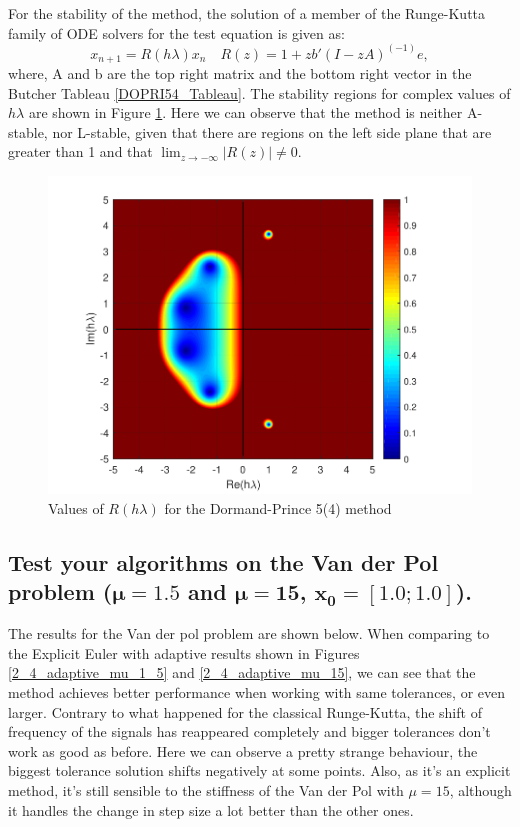 For the stability of the method, the solution of a member of the Runge-Kutta family of ODE solvers for the test equation is given as:
\begin{equation*}
    x_{n+1} = R(h \lambda) x_n \hspace{1em} R(z) = 1 + z b'(I-zA)^(-1)e,
\end{equation*}
where, A and b are the top right matrix and the bottom right vector in the Butcher Tableau \ref{DOPRI54_Tableau}. The stability regions for complex values of $h\lambda$ are shown in Figure \ref{7_3_stability_regions}. Here we can observe that the method is neither A-stable, nor L-stable, given that there are regions on the left side plane that are greater than 1 and that $\lim_{z \to -\infty}|R(z)| \neq 0$.

\begin{figure}[H]
    \centering
    \includegraphics[width=0.7\linewidth]{images/7/7_3_stability_regions.pdf} 
    \caption{Values of $R(h\lambda)$ for the Dormand-Prince 5(4) method}
    \label{7_3_stability_regions}
\end{figure}

\pagebreak

\subsection{Test your algorithms on the Van der Pol problem \texorpdfstring{($\mathbf{\mu = 1.5}$ and $\mathbf{\mu = 15}$, $\mathbf{x_0 = [1.0;1.0]}$).}{(mu = 1.5 and mu = 15, x0 = [1.0;1.0]).}}
The results for the Van der pol problem are shown below. When comparing to the Explicit Euler with adaptive results shown in Figures \ref{2_4_adaptive_mu_1_5} and \ref{2_4_adaptive_mu_15}, we can see that the method achieves better performance when working with same tolerances, or even larger. Contrary to what happened for the classical Runge-Kutta, the shift of frequency of the signals has reappeared completely and bigger tolerances don't work as good as before. Here we can observe a pretty strange behaviour, the biggest tolerance solution shifts negatively at some points. Also, as it's an explicit method, it's still sensible to the stiffness of the Van der Pol with $\mu=15$, although it handles the change in step size a lot better than the other ones. 

